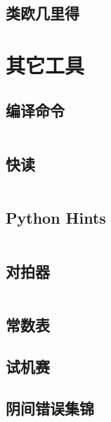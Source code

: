 \documentclass[10pt, a4paper, oneside]{ctexart}
\begin{document}
\begin{multicols}{2}
        \subsection{类欧几里得}
        

        \section{其它工具}
        \subsection{编译命令}
        \inputminted{bash}{src/tools/compile.sh}
        \subsection{快读}
        \inputminted{cpp}{src/tools/fastio.cpp}
        \subsection{Python Hints}
        \inputminted{python3}{src/tools/python_hint.py}
        \subsection{对拍器}
        \inputminted{python3}{src/tools/llx_checker.py}
        \subsection{常数表}
        
        \subsection{试机赛}
        
        \subsection{阴间错误集锦}
        
    \end{multicols}
\end{document}
